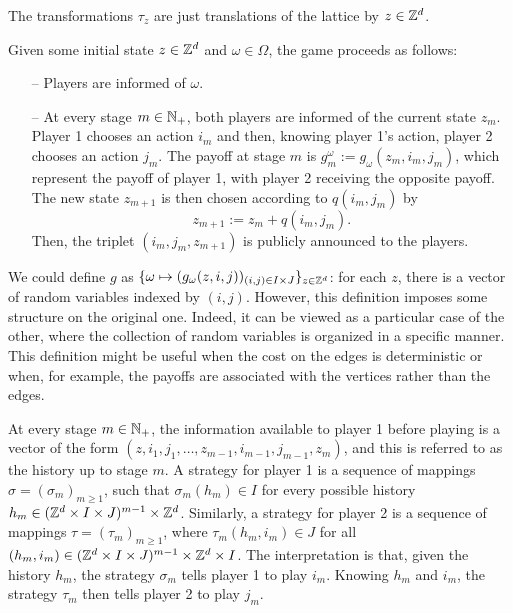 	The transformations $\tau_z$ are just translations of the lattice by $z \in \mathbb{Z}^d$.
	
	Given some initial state $z \in \mathbb{Z}^d$ and $\omega \in \Omega$, the game proceeds as follows:
	\begin{itemize}
		\item[--] Players are informed of $\omega$.
		\item[--] At every stage $m \in \mathbb{N}_+$, both players are informed of the current state $z_{m}$. Player 1 chooses an action $i_m$ and then, knowing player 1's action, player 2 chooses an action $j_m$. The payoff at stage $m$ is $g_m^{\omega} := g_{\omega}(z_{m}, i_m, j_m)$, which represent the payoff of player 1, with player 2 receiving the opposite payoff. The new state $z_{m + 1}$ is then chosen according to $q(i_m, j_m)$ by  
		\[
			z_{m+1} := z_m + q(i_m, j_m).
		\]
		Then, the triplet $(i_m, j_m, z_{m+1})$ is publicly announced to the players.
	\end{itemize}

	\begin{remark}
		We could define $g$ as $\{\omega \mapsto (g_{\omega}(z,i,j))_{(i, j) \in I \times J}\}_{z \in \mathbb{Z}^d}$: for each $z$, there is a vector of random variables indexed by $(i, j)$. However, this definition imposes some structure on the original one. Indeed, it can be viewed as a particular case of the other, where the collection of random variables is organized in a specific manner. This definition might be useful when the cost on the edges is deterministic or when, for example, the payoffs are associated with the vertices rather than the edges.
	\end{remark}

	At every stage $m \in \mathbb{N}_+$, the information available to player 1 before playing is a vector of the form $(z, i_1, j_1, \ldots, z_{m-1}, i_{m-1}, j_{m-1}, z_m)$, and this is referred to as the history up to stage $m$. A strategy for player 1 is a sequence of mappings $\sigma = (\sigma_m)_{m\geq 1}$, such that $\sigma_m(h_{m}) \in I$ for every possible history $h_{m} \in (\mathbb{Z}^{d}\times I \times J)^{m-1} \times \mathbb{Z}^d$. Similarly, a strategy for player 2 is a sequence of mappings $\tau = (\tau_m)_{m \geq 1}$, where $\tau_m(h_m, i_m) \in J$ for all $(h_m, i_m) \in (\mathbb{Z}^{d}\times I \times J)^{m-1} \times \mathbb{Z}^d \times I$. The interpretation is that, given the history $h_m$, the strategy $\sigma_m$ tells player 1 to play $i_m$. Knowing $h_m$ and $i_m$, the strategy $\tau_m$ then tells player 2 to play $j_m$.

